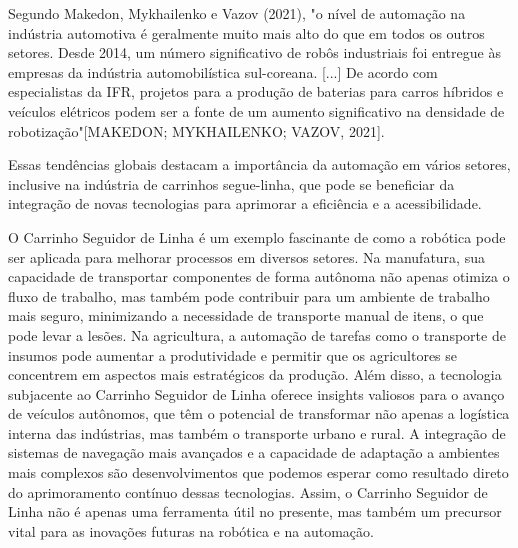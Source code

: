 Segundo Makedon, Mykhailenko e Vazov (2021), "o nível de automação na indústria automotiva é geralmente muito mais alto do que em todos os outros setores. Desde 2014, um número significativo de robôs industriais foi entregue às empresas da indústria automobilística sul-coreana. [...] De acordo com especialistas da IFR, projetos para a produção de baterias para carros híbridos e veículos elétricos podem ser a fonte de um aumento significativo na densidade de robotização"[MAKEDON; MYKHAILENKO; VAZOV, 2021].

Essas tendências globais destacam a importância da automação em vários setores, inclusive na indústria de carrinhos segue-linha, que pode se beneficiar da integração de novas tecnologias para aprimorar a eficiência e a acessibilidade.

O Carrinho Seguidor de Linha é um exemplo fascinante de como a robótica pode ser aplicada para melhorar processos em diversos setores. Na manufatura, sua capacidade de transportar componentes de forma autônoma não apenas otimiza o fluxo de trabalho, mas também pode contribuir para um ambiente de trabalho mais seguro, minimizando a necessidade de transporte manual de itens, o que pode levar a lesões. Na agricultura, a automação de tarefas como o transporte de insumos pode aumentar a produtividade e permitir que os agricultores se concentrem em aspectos mais estratégicos da produção. Além disso, a tecnologia subjacente ao Carrinho Seguidor de Linha oferece insights valiosos para o avanço de veículos autônomos, que têm o potencial de transformar não apenas a logística interna das indústrias, mas também o transporte urbano e rural. A integração de sistemas de navegação mais avançados e a capacidade de adaptação a ambientes mais complexos são desenvolvimentos que podemos esperar como resultado direto do aprimoramento contínuo dessas tecnologias. Assim, o Carrinho Seguidor de Linha não é apenas uma ferramenta útil no presente, mas também um precursor vital para as inovações futuras na robótica e na automação.



